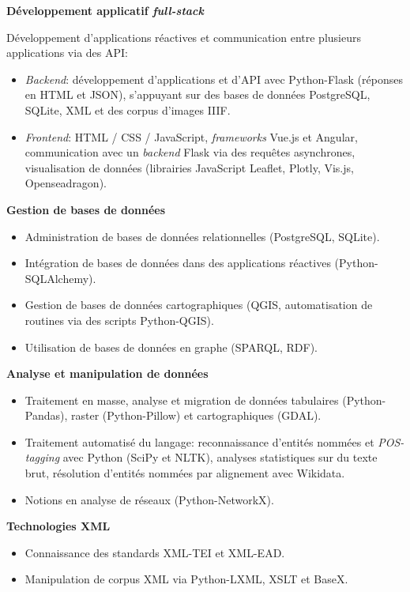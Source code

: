\datedsubsection{ }
{}
{%
	\textbf{Développement applicatif \textit{full-stack}}}
{%
	Développement d'applications réactives et communication entre plusieurs applications via des API: 
	\begin{itemize}
		\item \textit{Backend}: développement d'applications et d'API avec Python-Flask (réponses en HTML et JSON), s'appuyant sur des bases de données PostgreSQL, SQLite, XML et des corpus d'images IIIF.
		\item \textit{Frontend}: HTML / CSS / JavaScript, \textit{frameworks} Vue.js et Angular, communication avec un \textit{backend} Flask via des requêtes asynchrones, visualisation de données (librairies JavaScript Leaflet, Plotly, Vis.js, Openseadragon).
	\end{itemize}
}

\datedsubsection{ }
{}
{%
	\textbf{Gestion de bases de données}}
{%
	\begin{itemize}
		\item Administration de bases de données relationnelles (PostgreSQL, SQLite).
		\item Intégration de bases de données dans des applications réactives (Python-SQLAlchemy).
		\item Gestion de bases de données cartographiques (QGIS, automatisation de routines via des scripts Python-QGIS).
		\item Utilisation de bases de données en graphe (SPARQL, RDF).
	\end{itemize}
}

\datedsubsection{ }
{}
{%
	\textbf{Analyse et manipulation de données}}
{%
	\begin{itemize}
		\item Traitement en masse, analyse et migration de données tabulaires (Python-Pandas), raster (Python-Pillow) et cartographiques (GDAL).
		\item Traitement automatisé du langage: reconnaissance d'entités nommées et \textit{POS-tagging} avec Python (SciPy et NLTK), analyses statistiques sur du texte brut, résolution d'entités nommées par alignement avec Wikidata.
		\item Notions en analyse de réseaux (Python-NetworkX).
	\end{itemize}
}

\datedsubsection{ }
{}
{%
	\textbf{Technologies XML}}
{%
	\begin{itemize}
		\item Connaissance des standards XML-TEI et XML-EAD.
		\item Manipulation de corpus XML via Python-LXML, XSLT et BaseX.
	\end{itemize}
}

